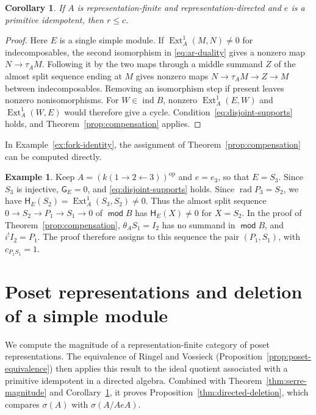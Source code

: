 \documentclass[a4paper,reqno,10pt]{amsart}
\newtheorem{corollary}[theorem]{Corollary}
\theoremstyle{definition}
\newtheorem{example}[theorem]{Example}
\numberwithin{equation}{section}
\DeclareMathOperator{\moduleCategory}{\mathsf{mod}}
\renewcommand{\mod}{\moduleCategory}
\DeclareMathOperator{\ind}{ind}
\DeclareMathOperator{\Ext}{Ext}
\DeclareMathOperator{\rad}{rad}
\newcommand{\op}{\mathrm{op}}
\begin{document}
\begin{corollary}\label{cor:directed-compensation}
If \(A\) is representation-finite and representation-directed and
\(e\) is a primitive idempotent, then \(r\leq c\).
\end{corollary}
\begin{proof}
Here \(E\) is a single simple module. If \(\Ext_A^1(M,N)\ne0\) for
indecomposables, the second isomorphism in \eqref{eq:ar-duality} gives a
nonzero map \(N\to\tau_A M\). Following it by the two maps through a middle
summand \(Z\) of the almost split sequence ending at \(M\) gives nonzero
maps \(N\to\tau_A M\to Z\to M\) between indecomposables. Removing an isomorphism step if present leaves nonzero
nonisomorphisms. For \(W\in\ind B\), nonzero \(\Ext_A^1(E,W)\) and
\(\Ext_A^1(W,E)\) would therefore give a cycle. Condition~\eqref{eq:disjoint-supports}
holds, and Theorem~\ref{prop:compensation} applies.
\end{proof}

In Example~\ref{ex:fork-identity}, the assignment of
Theorem~\ref{prop:compensation} can be computed directly.
\begin{example}\label{ex:fork-compensation}
Keep \(A=(k(1\to2\leftarrow3))^{\op}\) and \(e=e_3\), so that
\(E=S_3\). Since \(S_3\) is injective, \(\mathsf G_E=0\), and
\eqref{eq:disjoint-supports} holds. Since \(\rad P_3=S_2\), we have
\(\mathsf H_E(S_2)=\Ext_A^1(S_3,S_2)\ne0\). Thus the almost split
sequence \(0\to S_2\to P_1\to S_1\to0\) of \(\mod B\) has
\(\mathsf H_E(X)\ne0\) for \(X=S_2\). In the proof of
Theorem~\ref{prop:compensation}, \(\theta_A S_1=I_2\) has no summand in
\(\mod B\), and \(i^!I_2=P_1\). The proof therefore assigns to this
sequence the pair \((P_1,S_1)\), with \(c_{P_1S_1}=1\).
\end{example}

\section{Poset representations and deletion of a simple module}\label{sec:deletion}
We compute the magnitude of a representation-finite category of poset
representations. The equivalence of Ringel and Vossieck
(Proposition~\ref{prop:poset-equivalence}) then applies this result to the
ideal quotient associated with a primitive idempotent in a directed
algebra. Combined with Theorem~\ref{thm:serre-magnitude} and
Corollary~\ref{cor:directed-compensation}, it proves
Proposition~\ref{thm:directed-deletion}, which compares \(\sigma(A)\) with
\(\sigma(A/AeA)\).
\end{document}
